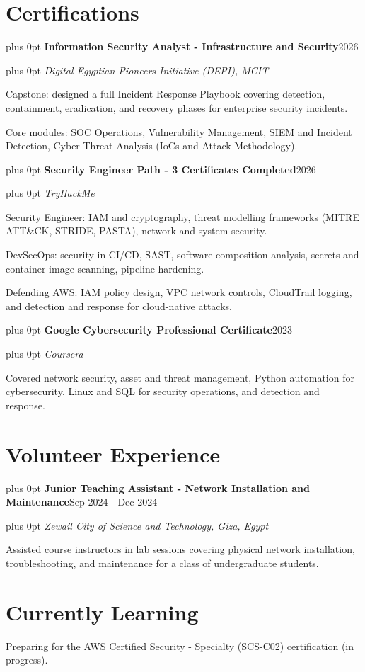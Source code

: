 \documentclass[10pt,letterpaper]{article}
\newcommand{\headerrow}[2]{%
  \begingroup\rightskip=0pt plus 0pt\relax
  #1\hfill #2\par\endgroup}
\newcommand{\entry}[4]{%
  \headerrow{\textbf{#1}}{#2}%
  \headerrow{\textit{#3}}{\textit{#4}}%
  \vspace{0.1em}}
\newenvironment{block}{\vspace{0.05em}\begingroup}{\endgroup\vspace{0.2em}}
\begin{document}
\section*{Certifications}

\entry{Information Security Analyst - Infrastructure and Security}{2026}
      {Digital Egyptian Pioneers Initiative (DEPI), MCIT}{}
\begin{tight}
  \item Capstone: designed a full Incident Response Playbook covering detection, containment, eradication, and recovery phases for enterprise security incidents.
  \item Core modules: SOC Operations, Vulnerability Management, SIEM and Incident Detection, Cyber Threat Analysis (IoCs and Attack Methodology).
\end{tight}
\vspace{0.22em}

\entry{Security Engineer Path - 3 Certificates Completed}{2026}
      {TryHackMe}{}
\begin{tight}
  \item Security Engineer: IAM and cryptography, threat modelling frameworks (MITRE ATT\&CK, STRIDE, PASTA), network and system security.
  \item DevSecOps: security in CI/CD, SAST, software composition analysis, secrets and container image scanning, pipeline hardening.
  \item Defending AWS: IAM policy design, VPC network controls, CloudTrail logging, and detection and response for cloud-native attacks.
\end{tight}
\vspace{0.22em}

\entry{Google Cybersecurity Professional Certificate}{2023}
      {Coursera}{}
\begin{tight}
  \item Covered network security, asset and threat management, Python automation for cybersecurity, Linux and SQL for security operations, and detection and response.
\end{tight}

\section*{Volunteer Experience}

\entry{Junior Teaching Assistant - Network Installation and Maintenance}{Sep 2024 - Dec 2024}
      {Zewail City of Science and Technology, Giza, Egypt}{}
\begin{tight}
  \item Assisted course instructors in lab sessions covering physical network installation, troubleshooting, and maintenance for a class of undergraduate students.
\end{tight}

\section*{Currently Learning}
\begin{block}
Preparing for the AWS Certified Security - Specialty (SCS-C02) certification (in progress).
\end{block}
\end{document}
